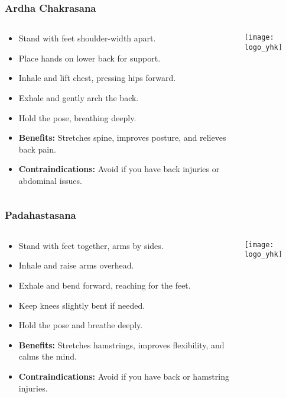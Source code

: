 \begin{frame}[fragile]\frametitle{Ardha Chakrasana}
\begin{columns}
    \begin{column}[T]{0.5\linewidth}
      \begin{itemize}
        \item Stand with feet shoulder-width apart.
        \item Place hands on lower back for support.
        \item Inhale and lift chest, pressing hips forward.
        \item Exhale and gently arch the back.
        \item Hold the pose, breathing deeply.
        \item \textbf{Benefits:} Stretches spine, improves posture, and relieves back pain.
        \item \textbf{Contraindications:} Avoid if you have back injuries or abdominal issues.
      \end{itemize}
    \end{column}
    \begin{column}[T]{0.5\linewidth}
        \begin{center}
        \texttt{[image: logo\_yhk]}
        \end{center}    
    \end{column}
  \end{columns}
\end{frame}

\begin{frame}[fragile]\frametitle{Padahastasana}
\begin{columns}
    \begin{column}[T]{0.5\linewidth}
      \begin{itemize}
        \item Stand with feet together, arms by sides.
        \item Inhale and raise arms overhead.
        \item Exhale and bend forward, reaching for the feet.
        \item Keep knees slightly bent if needed.
        \item Hold the pose and breathe deeply.
        \item \textbf{Benefits:} Stretches hamstrings, improves flexibility, and calms the mind.
        \item \textbf{Contraindications:} Avoid if you have back or hamstring injuries.
      \end{itemize}
    \end{column}
    \begin{column}[T]{0.5\linewidth}
        \begin{center}
        \texttt{[image: logo\_yhk]}
        \end{center}    
    \end{column}
  \end{columns}
\end{frame}

